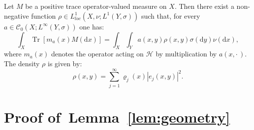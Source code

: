 \documentclass[AHL,Unicode,longabstracts]{cedram}
\DeclareMathOperator{\Trr}{Tr}
\newcommand*\loc{loc}
\newcommand*\Tr{\Trr}
\numberwithin{equation}{section}
\newcommand*{\dd}{\mathrm{d}}
\newcommand*{\dx}{\dd x}
\newcommand*{\dy}{\dd y}
\begin{document}
\begin{lemm}\label{lem:abs}
Let $M$ be a positive trace operator-valued measure on $X$. Then there exist a non-negative function $\rho\in L^1_{\loc}(X,\nu;L^1(Y,\sigma))$ such that, for every $a\in \mathcal{C}_0(X; L^\infty(Y,\sigma))$ one has:
\[
\int_X \Tr[m_a(x) M(\dx)] = \int_X \int_Y a(x,y) \rho(x,y)\sigma(\dy) \nu(\dx),
\]
where $m_a(x)$ denotes the operator acting on $\mathcal{H}$ by multiplication by $a(x,\cdot\,)$. The density $\rho$ is given by:
\[
\rho(x,y)=\sum_{j=1}^\infty \varrho_j(x)|e_j(x,y)|^2.
\]
\end{lemm}



\section{Proof of~Lemma~\ref{lem:geometry}}\label{sec:app_proof}
\end{document}
